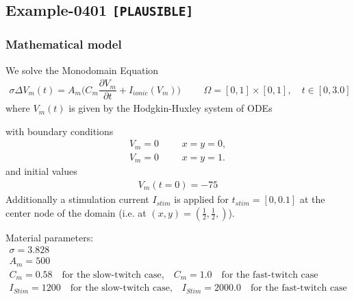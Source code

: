 %
\clearpage
%
\subsection{Example-0401 \texttt{[PLAUSIBLE]}}
%
%
\subsubsection{Mathematical model}
%
We solve the Monodomain Equation
%
\begin{align}
    \sigma \Delta V_m(t) = A_m\Big(C_m \dfrac{\partial V_m}{\partial t} + I_{ionic}(V_m)\Big) & &&\Omega = [0, 1] \times [0, 1], \quad t \in [0, 3.0]
\end{align}
%
where $V_m(t)$ is given by the Hodgkin-Huxley system of ODEs \cite{hodgkin1952propagation}

with boundary conditions
%
\begin{align}
    V_m = 0 & &&x = y = 0, \\
    V_m = 0 & &&x = y = 1.
\end{align}
and initial values 
%
\begin{equation*}
  \begin{array}{lll}
    V_m(t=0) = -75
  \end{array}
\end{equation*}
%
Additionally a stimulation current $I_{stim}$ is applied for $t_{stim} = [0, 0.1]$ at the center node of the domain (i.e. at $(x,y) = (\frac12, \frac12,)$).
%

Material parameters:
\begin{equation*}
  \begin{array}{lll}
    \sigma = 3.828\\[4mm]
    A_m = 500\\[4mm]
    C_m = 0.58 \quad \text{for the slow-twitch case,} \quad C_m = 1.0 \quad \text{for the fast-twitch case}\\[4mm]
    I_{Stim} = 1200 \quad \text{for the slow-twitch case,} \quad I_{Stim} = 2000.0 \quad \text{for the fast-twitch case}\\[4mm]    
  \end{array}
\end{equation*}
%
%
